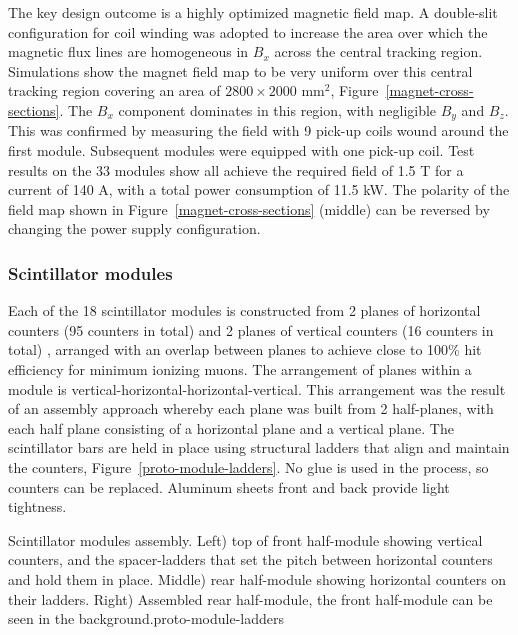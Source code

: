The key design outcome is a highly optimized magnetic field map. A double-slit configuration for coil winding was adopted to increase the area over which the magnetic flux lines are homogeneous in $B_x$ across the central tracking region. Simulations show the magnet field map to be very uniform over this central tracking region covering an area of $2800\times2000$ mm$^2$, Figure~\ref{magnet-cross-sections}. The $B_x$ component dominates in this region, with negligible $B_y$ and $B_z$. This was confirmed by measuring the field with 9 pick-up coils wound around the first module. Subsequent modules were equipped with one pick-up coil. Test results on the 33 modules show all achieve the required field of 1.5 T for a current of 140 A, with a total power consumption of 11.5 kW. The polarity of the field map shown in Figure~\ref{magnet-cross-sections} (middle) can be reversed by changing the power supply configuration.

\subsubsection{Scintillator modules}
Each of the 18 scintillator modules is constructed from 2 planes of horizontal counters (95 counters in total) and 2 planes of vertical counters (16 counters in total) \cite{Antonova:2017tuf}, arranged with an overlap between planes to achieve close to 100\% hit efficiency for minimum ionizing muons. The arrangement of planes within a module is vertical-horizontal-horizontal-vertical. This arrangement was the result of an assembly approach whereby each plane was built from 2 half-planes, with each half plane consisting of a horizontal plane and a vertical plane.
The scintillator bars are held in place using structural ladders that align and maintain the counters, Figure~\ref{proto-module-ladders}. No glue is used in the process, so counters can be replaced. Aluminum sheets front and back provide light tightness.

 {Scintillator modules assembly. Left) top of front half-module showing vertical counters, and the spacer-ladders that set the pitch between horizontal counters and hold them in place. Middle) rear half-module showing horizontal counters on their ladders. Right) Assembled rear half-module, the front half-module can be seen in the background.}{proto-module-ladders}

